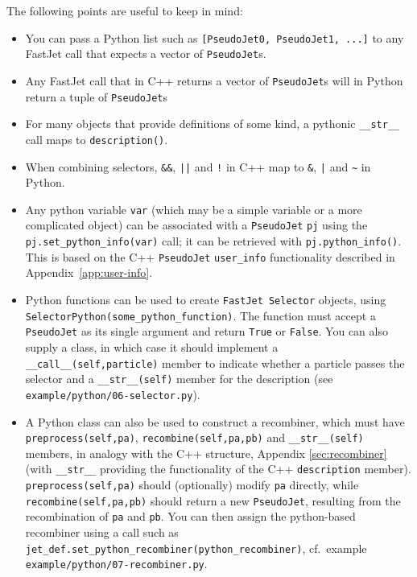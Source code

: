\documentclass[12pt,a4]{article}
\newcommand{\fastjet}{\texttt{FastJet}\xspace}
\newcommand{\ttt}[1]{{\small\texttt{#1}}}
\begin{document}
The following points are useful to keep in mind:
\begin{itemize}
\item You can pass a Python list such as \ttt{[PseudoJet0, PseudoJet1,
    ...]}  to any FastJet call that expects a vector of
  \ttt{PseudoJet}s.

\item Any FastJet call that in C++ returns a vector of \ttt{PseudoJet}s will
  in Python return a tuple of \ttt{PseudoJet}s

\item For many objects that provide definitions of some kind, a
  pythonic \ttt{\_\_str\_\_} call maps to \ttt{description()}.

\item When combining selectors, \ttt{\&\&}, \ttt{||} and \ttt{!} in
  C++ map to \ttt{\&}, \ttt{|} and \ttt{\~} in Python.

\item Any python variable \ttt{var} (which may be a simple variable or
  a more complicated object) can be associated with a \ttt{PseudoJet}
  \ttt{pj} using
  the \ttt{pj.set\_python\_info(var)} call; it can be retrieved with
  \ttt{pj.python\_info()}.
  This is based on the C++ \ttt{PseudoJet} \ttt{user\_info}
  functionality described in Appendix~\ref{app:user-info}.

\item Python functions can be used to create \fastjet\ \ttt{Selector}
  objects, using \ttt{SelectorPython(some\_python\_function)}. The
  function must accept a \ttt{PseudoJet} as its single argument and
  return \ttt{True} or \ttt{False}.
  You can also supply a class, in which case it should implement a
  \ttt{\_\_call\_\_(self,particle)} member to indicate whether a
  particle passes the selector and a \ttt{\_\_str\_\_(self)} member
  for the description (see \ttt{example/python/06-selector.py}).
  
\item A Python class can also be used to construct a recombiner, which
  must have \ttt{preprocess(self,pa)}, \ttt{recombine(self,pa,pb)} and
  \ttt{\_\_str\_\_(self)} members, in analogy with the C++ structure,
  Appendix \ref{sec:recombiner} (with \ttt{\_\_str\_\_} providing the
  functionality of the C++ \ttt{description} member).
  \ttt{preprocess(self,pa)} should (optionally) modify \ttt{pa}
  directly, while \ttt{recombine(self,pa,pb)} should return a new
  \ttt{PseudoJet}, resulting from the recombination of \ttt{pa} and
  \ttt{pb}.
  You can then assign the python-based recombiner using a call such as
  \ttt{jet\_def.set\_python\_recombiner(python\_recombiner)}, cf.\
  example \ttt{example/python/07-recombiner.py}.


\end{itemize}
\end{document}
